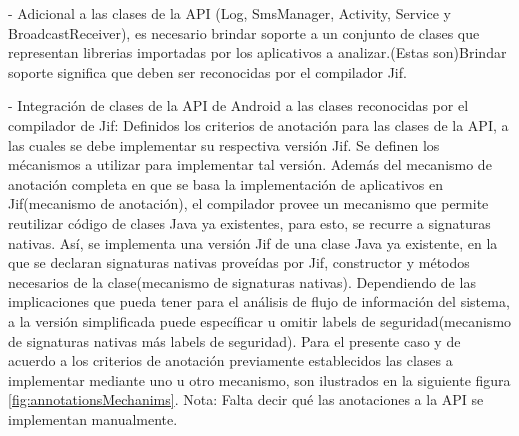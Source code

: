 - Adicional a las clases de la API (Log, SmsManager, Activity, Service y
BroadcastReceiver), es necesario brindar soporte a un conjunto de clases que
representan librerias importadas por los aplicativos a analizar.(Estas
son)Brindar soporte significa que deben ser reconocidas por el compilador Jif.

% 
- Integración de clases de la API de Android a las clases reconocidas por el
compilador de Jif:\newline
Definidos los criterios de anotación para las clases de la API, a las cuales se
debe implementar su respectiva versión Jif. Se definen los mécanismos a utilizar
para implementar tal versión. Además del mecanismo de anotación completa en que
se basa la implementación de aplicativos en Jif(mecanismo de anotación), el
compilador provee un mecanismo que permite reutilizar código de clases Java ya
existentes, para esto, se recurre a signaturas nativas. Así, se implementa una
versión Jif de una clase Java ya existente, en la que se declaran signaturas
nativas proveídas por Jif, constructor y métodos necesarios de la
clase(mecanismo de signaturas nativas).
Dependiendo de las implicaciones que pueda tener para el análisis de flujo de información del
sistema, a la versión simplificada puede específicar u omitir labels de
seguridad(mecanismo de signaturas nativas más labels de seguridad).\newline 
Para el presente caso y de acuerdo a los criterios de anotación previamente
establecidos las clases a implementar mediante uno u otro mecanismo, son
ilustrados en la siguiente figura \ref{fig:annotationsMechanims}.\newline
Nota: Falta decir qué las anotaciones a la API se implementan manualmente.

